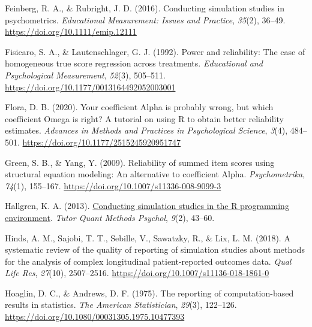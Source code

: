 \documentclass[
  11pt,
  man]{apa6}
\newlength{\cslhangindent}
\newlength{\cslentryspacingunit} %
\newenvironment{CSLReferences}[2] %
 {%
  \setlength{\parindent}{0pt}
  \ifodd #1
  \let\oldpar\par
  \def\par{\hangindent=\cslhangindent\oldpar}
  \fi
  \setlength{\parskip}{#2\cslentryspacingunit}
 }%
 {}
\begin{document}
\begin{CSLReferences}{1}{0}
\leavevmode{}%
Feinberg, R. A., \& Rubright, J. D. (2016). Conducting {simulation studies} in {psychometrics}. \emph{Educational Measurement: Issues and Practice}, \emph{35}(2), 36--49. \url{https://doi.org/10.1111/emip.12111}

\leavevmode{}%
Fisicaro, S. A., \& Lautenschlager, G. J. (1992). Power and {reliability}: {The case} of {homogeneous true score regression across treatments}. \emph{Educational and Psychological Measurement}, \emph{52}(3), 505--511. \url{https://doi.org/10.1177/0013164492052003001}

\leavevmode{}%
Flora, D. B. (2020). Your {coefficient Alpha is probably wrong}, but {which coefficient Omega is right}? {A tutorial} on {using R} to {obtain better reliability estimates}. \emph{Advances in Methods and Practices in Psychological Science}, \emph{3}(4), 484--501. \url{https://doi.org/10.1177/2515245920951747}

\leavevmode{}%
Green, S. B., \& Yang, Y. (2009). Reliability of {summed item scores using structural equation modeling}: {An alternative} to {coefficient Alpha}. \emph{Psychometrika}, \emph{74}(1), 155--167. \url{https://doi.org/10.1007/s11336-008-9099-3}

\leavevmode{}%
Hallgren, K. A. (2013). \href{https://www.ncbi.nlm.nih.gov/pmc/articles/PMC4110976}{Conducting {simulation studies} in the {R programming environment}}. \emph{Tutor Quant Methods Psychol}, \emph{9}(2), 43--60.

\leavevmode{}%
Hinds, A. M., Sajobi, T. T., Sebille, V., Sawatzky, R., \& Lix, L. M. (2018). A systematic review of the quality of reporting of simulation studies about methods for the analysis of complex longitudinal patient-reported outcomes data. \emph{Qual Life Res}, \emph{27}(10), 2507--2516. \url{https://doi.org/10.1007/s11136-018-1861-0}

\leavevmode{}%
Hoaglin, D. C., \& Andrews, D. F. (1975). The {reporting} of {computation-based results} in {statistics}. \emph{The American Statistician}, \emph{29}(3), 122--126. \url{https://doi.org/10.1080/00031305.1975.10477393}


\end{CSLReferences}
\end{document}
